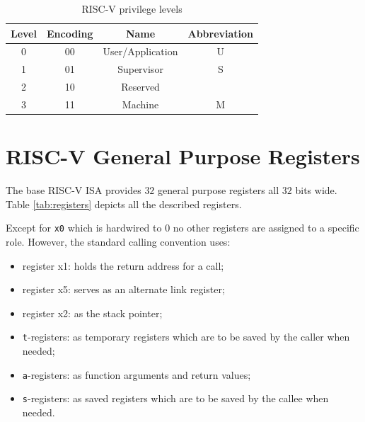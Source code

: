 \begin{table}
  \centering
  \begin{tabular}{|c|c|c|c|}
    \hline
    \textbf{Level} & \textbf{Encoding} & \textbf{Name}    & \textbf{Abbreviation} \\
    \hline
    0              & 00                & User/Application & U                     \\
    \hline
    1              & 01                & Supervisor       & S                     \\
    \hline
    2              & 10                & Reserved         &                       \\
    \hline
    3              & 11                & Machine          & M                     \\
    \hline
  \end{tabular}
  \caption{RISC-V privilege levels}
  \label{tab:priv}
\end{table}

\section{RISC-V General Purpose Registers}
\label{sec:riscv_reg}

The base RISC-V ISA provides $32$ general purpose registers all $32$ bits wide.
Table \ref{tab:registers} depicts all the described registers.

Except for \texttt{x0} which is hardwired to $0$ no other registers are assigned
to a specific role. However, the standard calling convention uses:
\begin{itemize}
  \item register x1: holds the return address for a call;

  \item register x5: serves as an alternate link register;

  \item register x2: as the stack pointer;

  \item \texttt{t}-registers: as temporary registers which are to be saved by the
    caller when needed;

  \item \texttt{a}-registers: as function arguments and return values;

  \item \texttt{s}-registers: as saved registers which are to be saved by the callee
    when needed.
\end{itemize}


